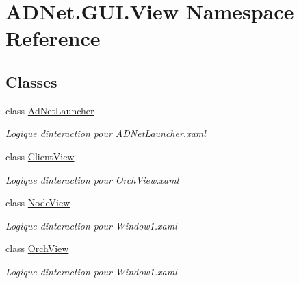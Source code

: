 \hypertarget{namespace_a_d_net_1_1_g_u_i_1_1_view}{}\section{A\+D\+Net.\+G\+U\+I.\+View Namespace Reference}
\label{namespace_a_d_net_1_1_g_u_i_1_1_view}
\subsection*{Classes}
\begin{DoxyCompactItemize}
\item 
class \hyperlink{class_a_d_net_1_1_g_u_i_1_1_view_1_1_ad_net_launcher}{Ad\+Net\+Launcher}
\begin{DoxyCompactList}\small\item\em Logique d\textquotesingle{}interaction pour A\+D\+Net\+Launcher.\+xaml \end{DoxyCompactList}\item 
class \hyperlink{class_a_d_net_1_1_g_u_i_1_1_view_1_1_client_view}{Client\+View}
\begin{DoxyCompactList}\small\item\em Logique d\textquotesingle{}interaction pour Orch\+View.\+xaml \end{DoxyCompactList}\item 
class \hyperlink{class_a_d_net_1_1_g_u_i_1_1_view_1_1_node_view}{Node\+View}
\begin{DoxyCompactList}\small\item\em Logique d\textquotesingle{}interaction pour Window1.\+xaml \end{DoxyCompactList}\item 
class \hyperlink{class_a_d_net_1_1_g_u_i_1_1_view_1_1_orch_view}{Orch\+View}
\begin{DoxyCompactList}\small\item\em Logique d\textquotesingle{}interaction pour Window1.\+xaml \end{DoxyCompactList}\end{DoxyCompactItemize}
